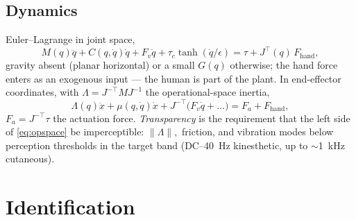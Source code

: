 \documentclass[conference]{IEEEtran}
\begin{document}
\subsection{Dynamics}
Euler--Lagrange in joint space,
\begin{equation}
M(q)\ddot q + C(q,\dot q)\dot q + F_v\dot q + \tau_c\tanh(\dot q/\epsilon) = \tau + J^{\!\top}(q)\,F_{\mathrm{hand}},
\label{eq:hapdyn}
\end{equation}
gravity absent (planar horizontal) or a small $G(q)$ otherwise; the hand force enters as an exogenous input --- the human is part of the plant. In end-effector coordinates, with $\Lambda = J^{-\!\top}MJ^{-1}$ the operational-space inertia,
\begin{equation}
\Lambda(q)\ddot x + \mu(q,\dot q)\dot x + J^{-\!\top}\!\bigl(F_v\dot q + \ldots\bigr) = F_a + F_{\mathrm{hand}},
\label{eq:opspace}
\end{equation}
$F_a = J^{-\!\top}\tau$ the actuation force. \emph{Transparency} is the requirement that the left side of \eqref{eq:opspace} be imperceptible: $\|\Lambda\|, $ friction, and vibration modes below perception thresholds in the target band (DC--40~Hz kinesthetic, up to $\sim$1~kHz cutaneous).

\section{Identification}
\end{document}
